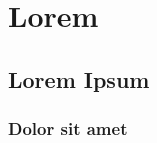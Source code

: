 \chapter{Lorem}

\lipsum[1]

\section{Lorem Ipsum}
\lipsum[2-4]

\subsection{Dolor sit amet}
\lipsum[5-7]